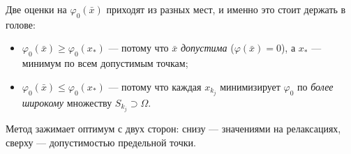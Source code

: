 \begin{idea}
Две оценки на $\varphi_0(\bar{x})$ приходят из разных мест, и именно это стоит
держать в голове:
\begin{itemize}[nosep,left=0pt]
  \item $\varphi_0(\bar{x}) \ge \varphi_0(x_*)$ — потому что $\bar{x}$
        \emph{допустима} ($\varphi(\bar x) = 0$), а $x_*$ — минимум по всем
        допустимым точкам;
  \item $\varphi_0(\bar{x}) \le \varphi_0(x_*)$ — потому что каждая $x_{k_j}$
        минимизирует $\varphi_0$ по \emph{более широкому} множеству
        $S_{k_j} \supset \Omega$.
\end{itemize}
Метод зажимает оптимум с двух сторон: снизу — значениями на релаксациях,
сверху — допустимостью предельной точки.
\end{idea}
